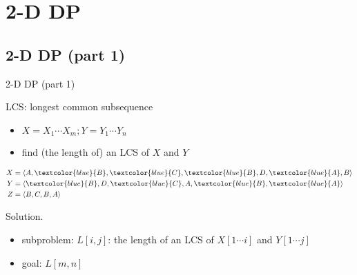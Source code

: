 \section{2-D DP}

\subsection{2-D DP (part 1)}
\begin{frame}{2-D DP (part 1)}
  \begin{exampleblock}{LCS: longest common subsequence }
    \begin{itemize}
      \item $X = X_{1} \cdots X_{m}; Y = Y_{1} \cdots Y_{n}$
      \item find (the length of) an LCS of $X$ and $Y$
    \end{itemize}
    \begin{align*}
      X &= \langle A,\textcolor{blue}{B},\textcolor{blue}{C},\textcolor{blue}{B},D,\textcolor{blue}{A},B \rangle  \\
      Y &= \langle \textcolor{blue}{B},D,\textcolor{blue}{C},A,\textcolor{blue}{B},\textcolor{blue}{A} \rangle \\
      Z &= \langle B,C,B,A \rangle
    \end{align*}
  \end{exampleblock}

  \begin{block}{Solution.}
    \begin{itemize}
      \item subproblem: $L[i,j]$: the length of an LCS of $X[1 \cdots i]$ and $Y[1 \cdots j]$
      \item goal: $L[m,n]$
    \end{itemize}
  \end{block}
\end{frame}
